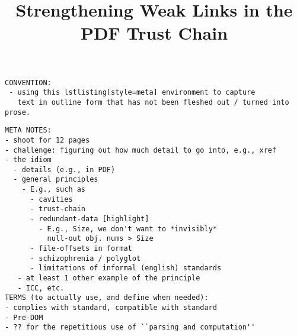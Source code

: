 \documentclass[conference,10pt]{IEEEtran}
\begin{document}
\date{}

\title{Strengthening Weak Links in the PDF Trust Chain}

\author{
     \and
}

\maketitle




\begin{lstlisting}[style=meta]
CONVENTION:
 - using this lstlisting[style=meta] environment to capture
   text in outline form that has not been fleshed out / turned into prose.
\end{lstlisting}

\begin{lstlisting}[style=meta]
META NOTES:  
- shoot for 12 pages
- challenge: figuring out how much detail to go into, e.g., xref
- the idiom
  - details (e.g., in PDF)
  - general principles
    - E.g., such as
      - cavities
      - trust-chain 
      - redundant-data [highlight]
        - E.g., Size, we don't want to *invisibly*
          null-out obj. nums > Size
      - file-offsets in format
      - schizophrenia / polyglot
      - limitations of informal (english) standards
   - at least 1 other example of the principle
   - ICC, etc.
TERMS (to actually use, and define when needed):
- complies with standard, compatible with standard
- Pre-DOM
- ?? for the repetitious use of ``parsing and computation''
\end{lstlisting}










\end{document}
